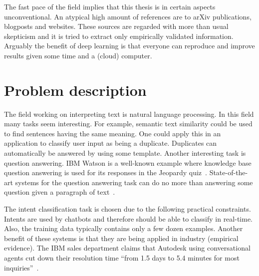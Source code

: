 The fast pace of the field implies that this thesis is in certain aspects unconventional.
An atypical high amount of references are to arXiv publications, blogposts and websites.
These sources are regarded with more than usual skepticism and it is tried to extract only empirically validated information.
Arguably the benefit of deep learning is that everyone can reproduce and improve results given some time and a (cloud) computer.

\section{Problem description}
\label{sec:problem_description}
The field working on interpreting text is natural language processing.
In this field many tasks seem interesting.
For example, semantic text similarity could be used to find sentences having the same meaning.
One could apply this in an application to classify user input as being a duplicate.
Duplicates can automatically be answered by using some template.
Another interesting task is question answering.
IBM Watson is a well-known example where knowledge base question answering is used for its responses in the Jeopardy quiz~\citep{high2012era}.
State-of-the-art systems for the question answering task can do no more than answering some question given a paragraph of text~\citep{}.

The intent classification task is chosen due to the following practical constraints.
Intents are used by chatbots and therefore should be able to classify in real-time.
Also, the training data typically contains only a few dozen examples.
Another benefit of these systems is that they are being applied in industry (empirical evidence).
The IBM sales department claims that Autodesk using conversational agents cut down their resolution time ``from 1.5 days to 5.4 minutes for most inquiries''~\citep{ibm2018autodesk}.

